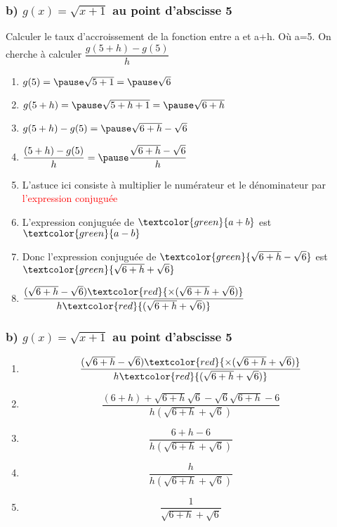 \documentclass[t]{beamer}
\begin{document}
	\begin{frame}
		\frametitle{b) $g(x) = \sqrt{x+1}$ au point d'abscisse 5}
		\pause
		Calculer le taux d'accroissement de la fonction entre a et a+h. \pause Où a=5.
		\pause
		On cherche à calculer \( \dfrac{g(5+h) - g(5)}{h} \)
		\pause
		\begin{enumerate}[]
			\item \(g(5) = \pause \sqrt{5+1} = \pause \sqrt{6} \)
			\pause
			\item \(g(5+h) = \pause \sqrt{5+h+1} = \pause \sqrt{6+h} \)
			\pause
			\item \(g(5+h) - g(5) = \pause \sqrt{6+h} - \sqrt{6} \)
			\pause
			\item \( \dfrac{(5+h) - g(5)}{h} = \pause \dfrac{\sqrt{6+h} - \sqrt{6}}{h} \)
			\pause
			\item L'astuce ici consiste à multiplier le numérateur et le dénominateur par \textcolor{red}{l'expression conjuguée}
			\pause
			\item L'expression conjuguée de $\textcolor{green}{a+b}$ est \pause $\textcolor{green}{a-b}$
			\pause
			\item Donc l'expression conjuguée de $\textcolor{green}{\sqrt{6+h} - \sqrt{6}}$ \pause est $\textcolor{green}{\sqrt{6+h} + \sqrt{6}}$
			\pause
			\item \(\dfrac{(\sqrt{6+h} - \sqrt{6}) \textcolor{red}{\times (\sqrt{6+h} + \sqrt{6})}}{h \textcolor{red}{(\sqrt{6+h} + \sqrt{6})}}\)
		\end{enumerate}
	\end{frame}

	\begin{frame}[label=pagebanale]
		\frametitle{b) $g(x) = \sqrt{x+1}$ au point d'abscisse 5}
		\pause
		\begin{enumerate}[]
			\item<+-> \[\dfrac{(\sqrt{6+h} - \sqrt{6}) \textcolor{red}{\times (\sqrt{6+h} + \sqrt{6})}}{h \textcolor{red}{(\sqrt{6+h} + \sqrt{6})}}\]
			\item<+-> \[\dfrac{(6+h) + \sqrt{6+h}\sqrt{6} - \sqrt{6}\sqrt{6+h} - 6}{h (\sqrt{6+h} + \sqrt{6})} \]
			\item<+-> \[\dfrac{6+h - 6}{h (\sqrt{6+h} + \sqrt{6})} \]
			\item<+-> \[\dfrac{h}{h (\sqrt{6+h} + \sqrt{6})} \]
			\item<+-> \[\dfrac{1}{\sqrt{6+h} + \sqrt{6}} \]
		\end{enumerate}
	\end{frame}
\end{document}
